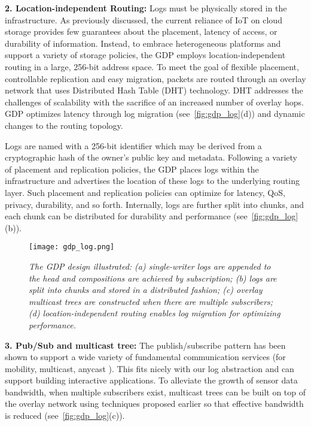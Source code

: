 \textbf{2. Location-independent Routing:} Logs must be physically
stored in the infrastructure. As previously discussed,
the current reliance of IoT on cloud storage provides
few guarantees about the placement, latency of access,
or durability of information. Instead, to embrace heterogeneous
platforms and support a variety of storage
policies, the GDP employs location-independent routing
in a large, 256-bit address space. To meet the goal of
flexible placement, controllable replication and easy migration,
packets are routed through an overlay network
that uses Distributed Hash Table (DHT) technology. DHT
addresses the challenges of scalability \cite{pastry, chord, tapestry} with
the sacrifice of an increased number of overlay hops. GDP
optimizes latency through log migration (see~\autoref{fig:gdp_log}(d))
and dynamic changes to the routing topology.

Logs are named with a 256-bit identifier which may be
derived from a cryptographic hash of the owner’s public
key and metadata. Following a variety of placement and
replication policies,
the GDP places logs within the infrastructure
and advertises the location of these logs to the
underlying routing layer. Such placement and replication
policies can optimize for latency, QoS, privacy, durability,
and so forth. Internally, logs are further split into chunks,
and each chunk can be distributed for durability \cite{oceanstore} and
performance \cite{bolt} (see~\autoref{fig:gdp_log}(b)).

\begin{figure}[t]
	\begin{center}
		\texttt{[image: gdp\_log.png]}
	\end{center}
	\vspace{-1.3em}
	\caption{\small \itshape  The GDP design illustrated: (a) single-writer logs are appended to the head and compositions are achieved by subscription;
		(b) logs are split into chunks and stored in a distributed fashion; (c) overlay multicast trees are constructed when there are multiple
		subscribers; (d) location-independent routing enables log migration for optimizing performance.}
	\vspace{-1em}
	\label{fig:gdp_log}
\end{figure}

\textbf{3. Pub/Sub and multicast tree:} The publish/subscribe
pattern has been shown to support a wide variety of fundamental
communication services (for mobility, multicast,
anycast \cite{indirection}). This fits nicely with our log abstraction
and can support building interactive applications. To
alleviate the growth of sensor data bandwidth, when multiple
subscribers exist, multicast trees can be built on top
of the overlay network using techniques proposed earlier \cite{cbt, tapestry} so that effective bandwidth is reduced \cite{end-system-mc} 
(see~\autoref{fig:gdp_log}(c)).

